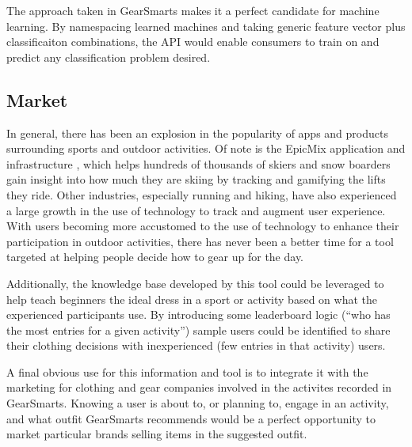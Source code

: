 The approach taken in GearSmarts makes it a perfect candidate for machine learning. By namespacing
learned machines and taking generic feature vector plus classificaiton combinations, the API would enable consumers to
train on and predict any classification problem desired.

\subsection{Market}
\label{section:market}
In general, there has been an explosion in the popularity of apps and products surrounding sports and outdoor activities.
Of note is the EpicMix application and infrastructure \cite{EpicMix:Site}, which helps hundreds of thousands of skiers and snow
boarders \cite{EpicMix:PlayStore} gain insight into how much they are skiing by tracking and gamifying the lifts they ride.
Other industries, especially running and hiking, have also experienced a large growth in the use of technology to track and
augment user experience. With users becoming more accustomed to the use of technology to enhance their participation in outdoor
activities, there has never been a better time for a tool targeted at helping people decide how to gear up for the day.

Additionally, the knowledge base developed by this tool could be leveraged to help teach beginners the ideal dress in a sport or activity
based on what the experienced participants use. By introducing some leaderboard logic (``who has the most entries for a given activity'')
sample users could be identified to share their clothing decisions with inexperienced (few entries in that activity) users.

A final obvious use for this information and tool is to integrate it with the marketing for clothing and gear companies
involved in the activites recorded in GearSmarts. Knowing a user is about to, or planning to, engage in an activity, and
what outfit GearSmarts recommends would be a perfect opportunity to market particular brands selling items in the suggested outfit.